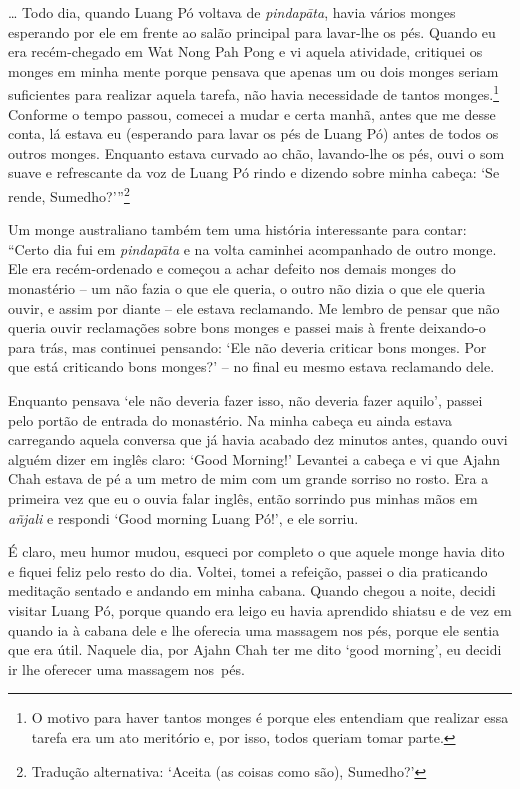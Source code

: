 \ldots{} Todo dia, quando Luang Pó voltava de \emph{pindapāta}, havia
vários monges esperando por ele em frente ao salão principal para
lavar-lhe os pés. Quando eu era recém-chegado em Wat Nong Pah Pong e vi
aquela atividade, critiquei os monges em minha mente porque pensava que
apenas um ou dois monges seriam suficientes para realizar aquela tarefa,
não havia necessidade de tantos monges.\footnote{O motivo para haver
  tantos monges é porque eles entendiam que realizar essa tarefa era um
  ato meritório e, por isso, todos queriam tomar parte.} Conforme o
tempo passou, comecei a mudar e certa manhã, antes que me desse conta,
lá estava eu (esperando para lavar os pés de Luang Pó) antes de todos os
outros monges. Enquanto estava curvado ao chão, lavando-lhe os pés, ouvi
o som suave e refrescante da voz de Luang Pó rindo e dizendo sobre minha
cabeça: `Se rende, Sumedho?'\thinspace ''\footnote{Tradução alternativa: `Aceita (as
  coisas como são), Sumedho?'}

Um monge australiano também tem uma história interessante para contar:
``Certo dia fui em \emph{pindapāta} e na volta caminhei acompanhado de
outro monge. Ele era recém-ordenado e começou a achar defeito nos demais
monges do monastério -- um não fazia o que ele queria, o outro não dizia
o que ele queria ouvir, e assim por diante -- ele estava reclamando. Me
lembro de pensar que não queria ouvir reclamações sobre bons monges e
passei mais à frente deixando-o para trás, mas continuei pensando: `Ele
não deveria criticar bons monges. Por que está criticando bons monges?'
-- no final eu mesmo estava reclamando dele.

Enquanto pensava `ele não deveria fazer isso, não deveria fazer aquilo',
passei pelo portão de entrada do monastério. Na minha cabeça eu ainda
estava carregando aquela conversa que já havia acabado dez minutos
antes, quando ouvi alguém dizer em inglês claro: `Good Morning!'
Levantei a cabeça e vi que Ajahn Chah estava de pé a um metro de mim com
um grande sorriso no rosto. Era a primeira vez que eu o ouvia falar
inglês, então sorrindo pus minhas mãos em \emph{añjali} e respondi `Good
morning Luang Pó!', e ele sorriu.

É claro, meu humor mudou, esqueci por completo o que aquele monge havia
dito e fiquei feliz pelo resto do dia. Voltei, tomei a refeição, passei
o dia praticando meditação sentado e andando em minha cabana. Quando
chegou a noite, decidi visitar Luang Pó, porque quando era leigo eu
havia aprendido shiatsu e de vez em quando ia à cabana dele e lhe
oferecia uma massagem nos pés, porque ele sentia que era útil. Naquele
dia, por Ajahn Chah ter me dito `good morning', eu decidi ir lhe
oferecer uma massagem nos~pés.

